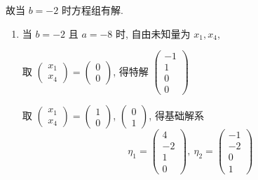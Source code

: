         故当 \( b = -2 \) 时方程组有解.
         \begin{enumerate}
             \item %
                   当 \( b = -2 \) 且 \( a = -8 \) 时, 自由未知量为 \( x_{1}, x_{4} \),

                   取 \( \begin{pmatrix}
                       x_{1} \\
                       x_{4}
                   \end{pmatrix} = \begin{pmatrix}
                       0 \\
                       0
                   \end{pmatrix} \), 得特解 \( \begin{pmatrix}
                       -1 \\
                       1  \\
                       0  \\
                       0
                   \end{pmatrix} \)

                   取 \( \begin{pmatrix}
                       x_{1} \\
                       x_{4}
                   \end{pmatrix} = \begin{pmatrix}
                       1 \\
                       0
                   \end{pmatrix} \), \( \begin{pmatrix}
                       0 \\
                       1
                   \end{pmatrix} \), 得基础解系
                   \[ \eta_{1} = \begin{pmatrix}
                           4  \\
                           -2 \\
                           1  \\
                           0
                       \end{pmatrix}, \  \eta_{2} = \begin{pmatrix}
                           -1 \\
                           -2 \\
                           0  \\
                           1
                       \end{pmatrix} \]


\end{enumerate}
